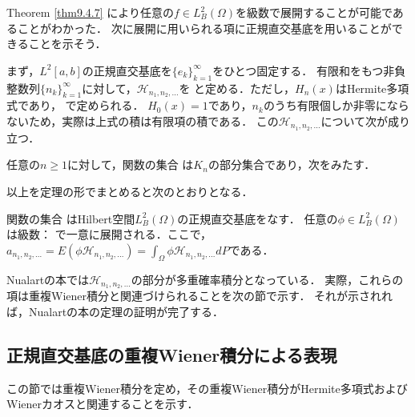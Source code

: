 Theorem \ref{thm9.4.7} により任意の$f\in L^2_B(\Omega)$を級数で展開することが可能であることがわかった．
次に展開に用いられる項に正規直交基底を用いることができることを示そう．

まず，$L^2[a,b]$の正規直交基底を$\{e_k\}_{k=1}^\infty$をひとつ固定する．
有限和をもつ非負整数列$\{n_k\}_{k=1}^\infty$に対して，$\mathcal{H}_{n_1,n_2,...}$を
と定める．ただし，$H_n(x)$はHermite多項式であり，
で定められる．
$H_0(x)=1$であり，$n_k$のうち有限個しか非零にならないため，実際は上式の積は有限項の積である．
この$\mathcal{H}_{n_1,n_2,...}$について次が成り立つ．
\begin{theorem}\label{thm9.5.3and9.5.4}%
任意の$n\ge1$に対して，関数の集合
は$K_n$の部分集合であり，次をみたす．
\end{theorem}

以上を定理の形でまとめると次のとおりとなる．
\begin{theorem}\label{thm9.5.7}%
関数の集合
はHilbert空間$L^2_B(\Omega)$の正規直交基底をなす．
任意の$\phi\in L^2_B(\Omega)$は級数：
で一意に展開される．ここで，$a_{n_1,n_2,...}=E(\phi\mathcal{H}_{n_1,n_2,...})=\int_\Omega\phi\mathcal{H}_{n_1,n_2,...}dP$である．
\end{theorem}
Nualartの本では$\mathcal{H}_{n_1,n_2,...}$の部分が多重確率積分となっている．
実際，これらの項は重複Wiener積分と関連づけられることを次の節で示す．
それが示されれば，Nualartの本の定理の証明が完了する．

\subsection{正規直交基底の重複Wiener積分による表現}
この節では重複Wiener積分を定め，その重複Wiener積分がHermite多項式およびWienerカオスと関連することを示す．

